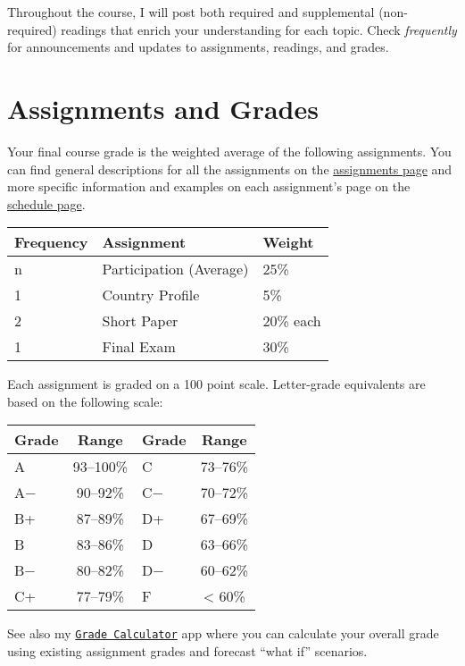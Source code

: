 \documentclass{article}
\begin{document}
Throughout the course, I will post both required and supplemental
(non-required) readings that enrich your understanding for each topic.
Check \emph{frequently} for announcements and updates to assignments,
readings, and grades.

\hypertarget{assignments-and-grades}{%
\section{Assignments and Grades}\label{assignments-and-grades}}

Your final course grade is the weighted average of the following
assignments. You can find general descriptions for all the assignments
on the
\href{http://devF21.classes.ryansafner.com/assignments/}{assignments
page} and more specific information and examples on each assignment's
page on the
\href{http://devF21.classes.ryansafner.com/schedule/}{schedule page}.

\begin{tabular}{l|l|l}
\hline
Frequency & Assignment & Weight\\
\hline
n & Participation (Average) & 25\%\\
\hline
1 & Country Profile & 5\%\\
\hline
2 & Short Paper & 20\% each\\
\hline
1 & Final Exam & 30\%\\
\hline
\end{tabular}

Each assignment is graded on a 100 point scale. Letter-grade equivalents
are based on the following scale:

\begin{table}
\centering
\begin{tabular}{l|c|l|c}
\hline
Grade & Range & Grade & Range\\
\hline
A & 93–100\% & C & 73–76\%\\
\hline
A− & 90–92\% & C− & 70–72\%\\
\hline
B+ & 87–89\% & D+ & 67–69\%\\
\hline
B & 83–86\% & D & 63–66\%\\
\hline
B− & 80–82\% & D− & 60–62\%\\
\hline
C+ & 77–79\% & F & < 60\%\\
\hline
\end{tabular}
\end{table}

See also my
\href{https://ryansafner.shinyapps.io/dev_grade_calculator/}{
\texttt{Grade\ Calculator}} app where you can calculate your overall
grade using existing assignment grades and forecast ``what if''
scenarios.
\end{document}
